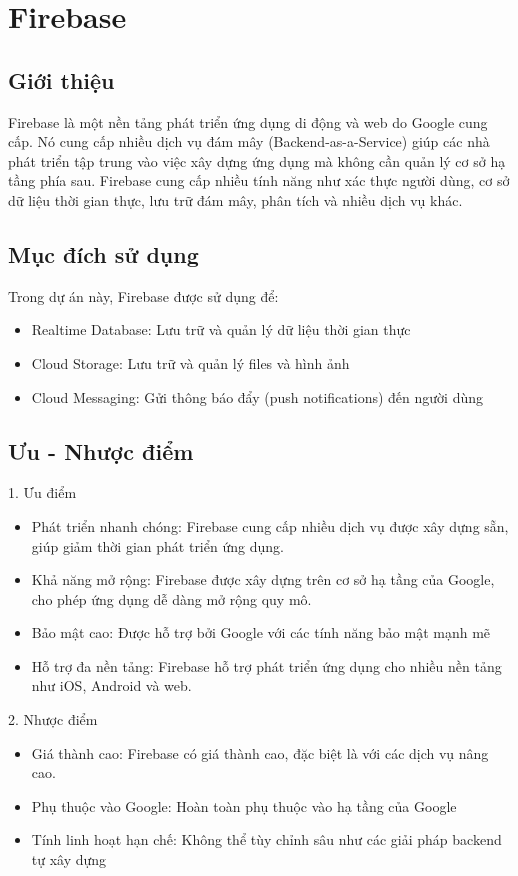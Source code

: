 \documentclass[../DoAn.tex]{subfiles}
\begin{document}
\section{Firebase}
\label{section:3.3}

\subsection{Giới thiệu}
\label{subsection:3.3.1}
Firebase là một nền tảng phát triển ứng dụng di động và web do Google 
cung cấp. Nó cung cấp nhiều dịch vụ đám mây (Backend-as-a-Service) 
giúp các nhà phát triển tập trung vào việc xây dựng ứng dụng mà không 
cần quản lý cơ sở hạ tầng phía sau. Firebase cung cấp nhiều tính năng 
như xác thực người dùng, cơ sở dữ liệu thời gian thực, lưu trữ đám mây, 
phân tích và nhiều dịch vụ khác.

\subsection{Mục đích sử dụng}
\label{subsection:3.3.2}
Trong dự án này, Firebase được sử dụng để:
\begin{itemize}
  \item Realtime Database: Lưu trữ và quản lý dữ liệu thời gian thực
  \item Cloud Storage: Lưu trữ và quản lý files và hình ảnh
  \item Cloud Messaging: Gửi thông báo đẩy (push notifications) đến người dùng
\end{itemize}

\subsection{Ưu -  Nhược điểm}
\label{subsection:3.3.3}
1. Ưu điểm
\begin{itemize}
  \item Phát triển nhanh chóng: Firebase cung cấp nhiều dịch vụ được xây dựng sẵn, giúp giảm thời gian phát triển ứng dụng.
  \item Khả năng mở rộng: Firebase được xây dựng trên cơ sở hạ tầng của Google, cho phép ứng dụng dễ dàng mở rộng quy mô.
  \item Bảo mật cao: Được hỗ trợ bởi Google với các tính năng bảo mật mạnh mẽ
  \item Hỗ trợ đa nền tảng: Firebase hỗ trợ phát triển ứng dụng cho nhiều nền tảng như iOS, Android và web.
\end{itemize}

2. Nhược điểm
\begin{itemize}
  \item Giá thành cao: Firebase có giá thành cao, đặc biệt là với các dịch vụ nâng cao.
  \item Phụ thuộc vào Google: Hoàn toàn phụ thuộc vào hạ tầng của Google
  \item Tính linh hoạt hạn chế: Không thể tùy chỉnh sâu như các giải pháp backend tự xây dựng
\end{itemize}
\end{document}
